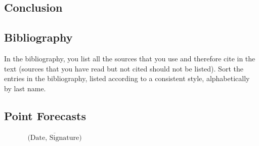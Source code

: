 \documentclass[11pt,a4paper]{article}
\begin{document}
\section{Conclusion}


\newpage


\pagestyle{fancy}						
\fancyhf{}								
\fancyhead[R]{}							 
\renewcommand{\headrulewidth}{0pt}	 
\fancyfoot[R]{\thepage}				 
\renewcommand{\footrulewidth}{0pt}	 
\setcounter{page}{5}
\newpage\clearpage

\newpage
{}
\section*{Bibliography}
In the bibliography, you list all the sources that you use and therefore cite in the text (sources that you have read but not cited should not be listed). Sort the entries in the bibliography, listed according to a consistent style, alphabetically by last name.





\begin{appendices}
\chapter{Point Forecasts}
\label{app:point-forecasts}

\end{appendices}

\newpage

\begin{flushright}
$\overline{~~~~~~~~~~~~~~~\mbox{(Date, Signature)}~~~~~~~~~~~~~~~}$
\end{flushright}
\end{document}

